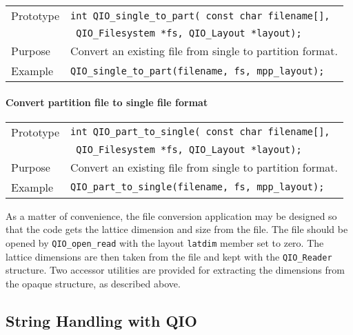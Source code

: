 \documentclass{article}
\begin{document}
\begin{flushleft}
  \begin{tabular}{|l|l|}
  \hline
  Prototype      & \verb|int QIO_single_to_part( const char filename[], | \\
                 & \verb| QIO_Filesystem *fs, QIO_Layout *layout);| \\
  Purpose        & Convert an existing file from single to partition format. \\
\hline
  Example  & \verb|QIO_single_to_part(filename, fs, mpp_layout);|\\
   \hline
 \end{tabular}
\end{flushleft}
%

\paragraph{Convert partition file to single file format}

\begin{flushleft}
  \begin{tabular}{|l|l|}
  \hline
  Prototype      & \verb|int QIO_part_to_single( const char filename[], | \\
                 & \verb| QIO_Filesystem *fs, QIO_Layout *layout);| \\
  Purpose        & Convert an existing file from single to partition format. \\
\hline
  Example  & \verb|QIO_part_to_single(filename, fs, mpp_layout);|\\
   \hline
 \end{tabular}
\end{flushleft}
%

As a matter of convenience, the file conversion application may be
designed so that the code gets the lattice dimension and size from the
file.  The file should be opened by \verb|QIO_open_read| with the
layout \verb|latdim| member set to zero.  The lattice dimensions are
then taken from the file and kept with the \verb|QIO_Reader|
structure.  Two accessor utilities are provided for extracting the
dimensions from the opaque structure, as described above.


\subsection{String Handling with QIO}
\end{document}

